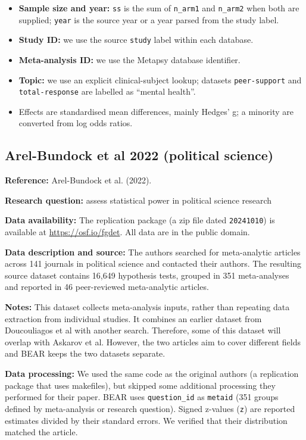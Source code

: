 \documentclass[
  11pt,
]{article}
\begin{document}
\begin{itemize}
\item
  \textbf{Sample size and year:} \texttt{ss} is the sum of
  \texttt{n\_arm1} and \texttt{n\_arm2} when both are supplied;
  \texttt{year} is the source year or a year parsed from the study
  label.
\item
  \textbf{Study ID:} we use the source \texttt{study} label within each
  database.
\item
  \textbf{Meta-analysis ID:} we use the Metapsy database identifier.
\item
  \textbf{Topic:} we use an explicit clinical-subject lookup; datasets
  \texttt{peer-support} and \texttt{total-response} are labelled as
  ``mental health''.
\item
  Effects are standardised mean differences, mainly Hedges' g; a
  minority are converted from log odds ratios.
\end{itemize}

\newpage

\subsection{Arel-Bundock et al 2022 (political science)}\label{arel-bundock-et-al-2022-political-science}

\textbf{Reference:}
Arel-Bundock et al. (2022).

\textbf{Research question:}
assess statistical power in political science research

\textbf{Data availability:}
The replication package (a zip file dated \texttt{20241010}) is available at
\url{https://osf.io/fgdet}. All data are in the public domain.

\textbf{Data description and source:}
The authors searched for meta-analytic articles across 141 journals in
political science and contacted their authors. The resulting source dataset contains 16,649
hypothesis tests, grouped in 351 meta-analyses and reported in 46 peer-reviewed
meta-analytic articles.

\textbf{Notes:}
This dataset collects meta-analysis inputs, rather than repeating data extraction
from individual studies. It combines an earlier dataset from Doucouliagos et al with
another search. Therefore, some of this dataset will overlap with Askarov et al.
However, the two articles aim to cover different fields and BEAR keeps the two
datasets separate.

\textbf{Data processing:}
We used the same code as the original authors (a replication package that uses
makefiles), but skipped some additional processing they performed for their paper.
BEAR uses \texttt{question\_id} as \texttt{metaid} (351 groups defined by meta-analysis or research question).
Signed z-values (\texttt{z}) are reported estimates divided by their standard
errors. We verified that their distribution matched the article.
\end{document}
